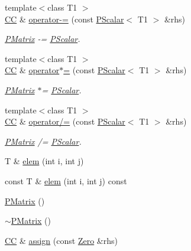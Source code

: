 \begin{DoxyCompactItemize}
{\footnotesize template$<$class T1 $>$ }\\\mbox{\hyperlink{classENSEM_1_1PMatrix_a744bac549029029effe32dc1705660ec}{CC}} \& \mbox{\hyperlink{classENSEM_1_1PMatrix_ad33381d53cc105f6f64869316aa0e2c2}{operator-\/=}} (const \mbox{\hyperlink{classENSEM_1_1PScalar}{P\+Scalar}}$<$ T1 $>$ \&rhs)
\begin{DoxyCompactList}\small\item\em \mbox{\hyperlink{classENSEM_1_1PMatrix}{P\+Matrix}} -\/= \mbox{\hyperlink{classENSEM_1_1PScalar}{P\+Scalar}}. \end{DoxyCompactList}\item 
{\footnotesize template$<$class T1 $>$ }\\\mbox{\hyperlink{classENSEM_1_1PMatrix_a744bac549029029effe32dc1705660ec}{CC}} \& \mbox{\hyperlink{classENSEM_1_1PMatrix_a4c25aeda146eb61d41abf6cf625a6153}{operator$\ast$=}} (const \mbox{\hyperlink{classENSEM_1_1PScalar}{P\+Scalar}}$<$ T1 $>$ \&rhs)
\begin{DoxyCompactList}\small\item\em \mbox{\hyperlink{classENSEM_1_1PMatrix}{P\+Matrix}} $\ast$= \mbox{\hyperlink{classENSEM_1_1PScalar}{P\+Scalar}}. \end{DoxyCompactList}\item 
{\footnotesize template$<$class T1 $>$ }\\\mbox{\hyperlink{classENSEM_1_1PMatrix_a744bac549029029effe32dc1705660ec}{CC}} \& \mbox{\hyperlink{classENSEM_1_1PMatrix_ade8246cb542a62e3368d33026885ca59}{operator/=}} (const \mbox{\hyperlink{classENSEM_1_1PScalar}{P\+Scalar}}$<$ T1 $>$ \&rhs)
\begin{DoxyCompactList}\small\item\em \mbox{\hyperlink{classENSEM_1_1PMatrix}{P\+Matrix}} /= \mbox{\hyperlink{classENSEM_1_1PScalar}{P\+Scalar}}. \end{DoxyCompactList}\item 
T \& \mbox{\hyperlink{classENSEM_1_1PMatrix_a358c5f1cd954ddda32677d9ad8765ef2}{elem}} (int i, int j)
\item 
const T \& \mbox{\hyperlink{classENSEM_1_1PMatrix_a5cacb33b2dcd4c33a9d3a135528a8bdf}{elem}} (int i, int j) const
\item 
\mbox{\hyperlink{classENSEM_1_1PMatrix_ae32acebccb43c577a9e4dde0866a6c78}{P\+Matrix}} ()
\item 
\mbox{\hyperlink{classENSEM_1_1PMatrix_a3196ba50adba3cc1e72bb29ce0b02cda}{$\sim$\+P\+Matrix}} ()
\item 
\mbox{\hyperlink{classENSEM_1_1PMatrix_a744bac549029029effe32dc1705660ec}{CC}} \& \mbox{\hyperlink{classENSEM_1_1PMatrix_a4d8aeb469d2295dc8c555a0180ab0613}{assign}} (const \mbox{\hyperlink{structENSEM_1_1Zero}{Zero}} \&rhs)

\end{DoxyCompactItemize}
